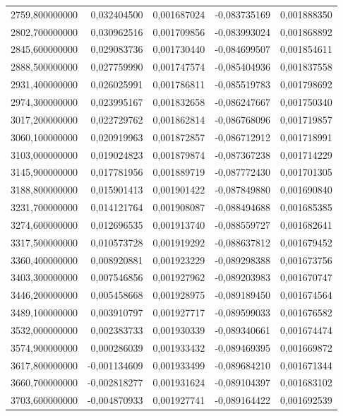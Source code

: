 \begin{longtable}{rrrrr}
2759,800000000 & 0,032404500 & 0,001687024 & -0,083735169 & 0,001888350\\
2802,700000000 & 0,030962516 & 0,001709856 & -0,083993024 & 0,001868892\\
2845,600000000 & 0,029083736 & 0,001730440 & -0,084699507 & 0,001854611\\
2888,500000000 & 0,027759990 & 0,001747574 & -0,085404936 & 0,001837558\\
2931,400000000 & 0,026025991 & 0,001786811 & -0,085519783 & 0,001798692\\
2974,300000000 & 0,023995167 & 0,001832658 & -0,086247667 & 0,001750340\\
3017,200000000 & 0,022729762 & 0,001862814 & -0,086768096 & 0,001719857\\
3060,100000000 & 0,020919963 & 0,001872857 & -0,086712912 & 0,001718991\\
3103,000000000 & 0,019024823 & 0,001879874 & -0,087367238 & 0,001714229\\
3145,900000000 & 0,017781956 & 0,001889719 & -0,087772430 & 0,001701305\\
3188,800000000 & 0,015901413 & 0,001901422 & -0,087849880 & 0,001690840\\
3231,700000000 & 0,014121764 & 0,001908087 & -0,088494688 & 0,001685385\\
3274,600000000 & 0,012696535 & 0,001913740 & -0,088559727 & 0,001682641\\
3317,500000000 & 0,010573728 & 0,001919292 & -0,088637812 & 0,001679452\\
3360,400000000 & 0,008920881 & 0,001923229 & -0,089298388 & 0,001673756\\
3403,300000000 & 0,007546856 & 0,001927962 & -0,089203983 & 0,001670747\\
3446,200000000 & 0,005458668 & 0,001928975 & -0,089189450 & 0,001674564\\
3489,100000000 & 0,003910797 & 0,001927717 & -0,089599033 & 0,001676582\\
3532,000000000 & 0,002383733 & 0,001930339 & -0,089340661 & 0,001674474\\
3574,900000000 & 0,000286039 & 0,001933432 & -0,089469395 & 0,001669872\\
3617,800000000 & -0,001134609 & 0,001933499 & -0,089684210 & 0,001671344\\
3660,700000000 & -0,002818277 & 0,001931624 & -0,089104397 & 0,001683102\\
3703,600000000 & -0,004870933 & 0,001927741 & -0,089164422 & 0,001692539\\

\end{longtable}
